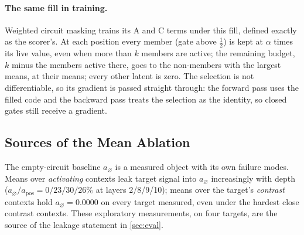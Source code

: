 \documentclass[10pt]{article}
\begin{document}
\paragraph{The same fill in training.}
Weighted circuit masking trains its A and C terms under this fill, defined exactly as the scorer's.
At each position every member (gate above $\tfrac{1}{2}$) is kept at $\alpha$ times its live value, even when more than $k$ members are active; the remaining budget, $k$ minus the members active there, goes to the non-members with the largest means, at their means; every other latent is zero.
The selection is not differentiable, so its gradient is passed straight through: the forward pass uses the filled code and the backward pass treats the selection as the identity, so closed gates still receive a gradient.

\subsection{Sources of the Mean Ablation}
\label{app:floors}
The empty-circuit baseline $a_{\varnothing}$ is a measured object with its own failure modes.
Means over \emph{activating} contexts leak target signal into $a_{\varnothing}$ increasingly with depth ($a_{\varnothing}/a_{\mathrm{pos}} = 0/23/30/26\%$ at layers 2/8/9/10); means over the target's \emph{contrast} contexts hold $a_{\varnothing} = 0.0000$ on every target measured, even under the hardest close contrast contexts.
These exploratory measurements, on four targets, are the source of the leakage statement in \cref{sec:eval}.

\end{document}

